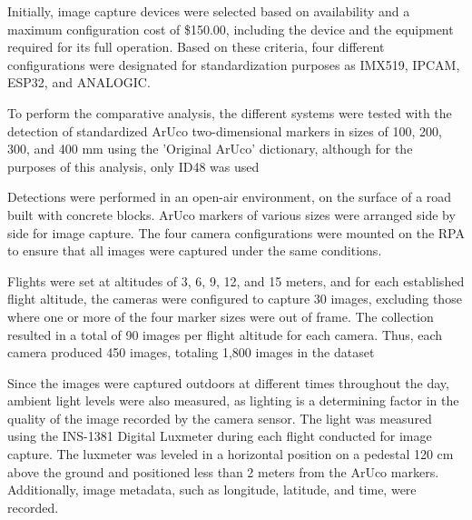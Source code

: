 \documentclass[letterpaper]{article}
\begin{document}
Initially, image capture devices were selected based on availability and a maximum configuration cost of \$150.00, including the device and the equipment required for its full operation. Based on these criteria, four different configurations were designated for standardization purposes as IMX519, IPCAM, ESP32, and ANALOGIC.

To perform the comparative analysis, the different systems were tested with the detection of standardized ArUco two-dimensional markers in sizes of 100, 200, 300, and 400 mm using the 'Original ArUco' dictionary, although for the purposes of this analysis, only ID48 was used

Detections were performed in an open-air environment, on the surface of a road built with concrete blocks. ArUco markers of various sizes were arranged side by side for image capture. The four camera configurations were mounted on the RPA to ensure that all images were captured under the same conditions.

Flights were set at altitudes of 3, 6, 9, 12, and 15 meters, and for each established flight altitude, the cameras were configured to capture 30 images, excluding those where one or more of the four marker sizes were out of frame. The collection resulted in a total of 90 images per flight altitude for each camera. Thus, each camera produced 450 images, totaling 1,800 images in the dataset

Since the images were captured outdoors at different times throughout the day, ambient light levels were also measured, as lighting is a determining factor in the quality of the image recorded by the camera sensor. The light was measured using the INS-1381 Digital Luxmeter during each flight conducted for image capture. The luxmeter was leveled in a horizontal position on a pedestal 120 cm above the ground and positioned less than 2 meters from the ArUco markers. Additionally, image metadata, such as longitude, latitude, and time, were recorded.





\end{document}
